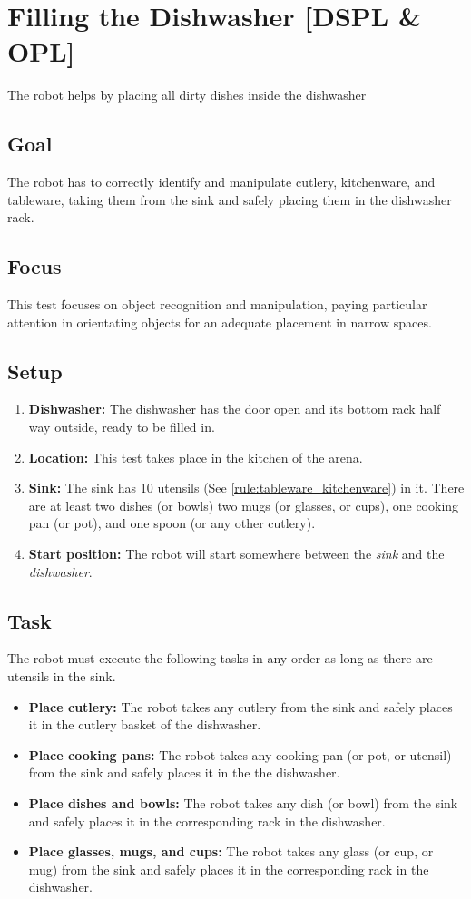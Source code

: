 \section{Filling the Dishwasher [DSPL \& OPL]}
The robot helps by placing all dirty dishes inside the dishwasher

\subsection{Goal}
The robot has to correctly identify and manipulate cutlery, kitchenware, and tableware, taking them from the sink and safely placing them in the dishwasher rack.

\subsection{Focus}
This test focuses on object recognition and manipulation, paying particular attention in orientating objects for an adequate placement in narrow spaces.

\subsection{Setup}
\begin{enumerate}
	\item \textbf{Dishwasher:} The dishwasher has the door open and its bottom rack half way outside, ready to be filled in.
	\item \textbf{Location:} This test takes place in the kitchen of the arena. 
	\item \textbf{Sink:} The sink has 10 utensils (See \ref{rule:tableware_kitchenware}) in it. There are at least two dishes (or bowls) two mugs (or glasses, or cups), one cooking pan (or pot), and one spoon (or any other cutlery).
	\item \textbf{Start position:} The robot will start somewhere between the \textit{sink} and the \textit{dishwasher}.
\end{enumerate}


\subsection{Task}
The robot must execute the following tasks in any order as long as there are utensils in the sink.
\begin{itemize}
	\item \textbf{Place cutlery:} The robot takes any cutlery from the sink and safely places it in the cutlery basket of the dishwasher.
	\item \textbf{Place cooking pans:} The robot takes any cooking pan (or pot, or utensil) from the sink and safely places it in the the dishwasher.
	\item \textbf{Place dishes and bowls:} The robot takes any dish (or bowl) from the sink and safely places it in the corresponding rack in the dishwasher.
	\item \textbf{Place glasses, mugs, and cups:} The robot takes any glass (or cup, or mug) from the sink and safely places it in the corresponding rack in the dishwasher.
\end{itemize}


